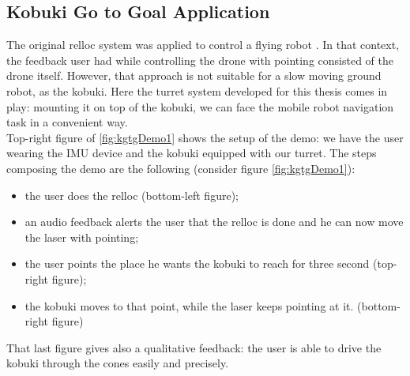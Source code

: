 \subsection{Kobuki Go to Goal Application}
The original \ac{relloc} system was applied to control a flying robot \cite{gromov2018robot}. In that context, the feedback user had while controlling the drone with pointing consisted of the drone itself. However, that approach is not suitable for a slow moving ground robot, as the kobuki. Here the turret system developed for this thesis comes in play: mounting it on top of the kobuki, we can face the mobile robot navigation task in a convenient way.\\
Top-right figure of \ref{fig:kgtgDemo1} shows the setup of the demo: we have the user wearing the \ac{IMU} device and the kobuki equipped with our turret. The steps composing the demo are the following (consider figure \ref{fig:kgtgDemo1}):
\begin{itemize}
    \item the user does the \ac{relloc} (bottom-left figure);
    \item an audio feedback alerts the user that the \ac{relloc} is done and he can now move the laser with pointing;
    \item the user points the place he wants the kobuki to reach for three second (top-right figure);
    \item the kobuki moves to that point, while the laser keeps pointing at it. (bottom-right figure)
\end{itemize}
That last figure gives also a qualitative feedback: the user is able to drive the kobuki through the cones easily and precisely.
